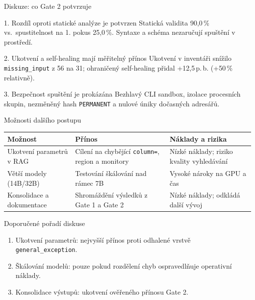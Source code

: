 \documentclass[aspectratio=169,11pt]{beamer}
\begin{document}
\begin{frame}[t]{Diskuze: co Gate 2 potvrzuje}
  \small
  \begin{block}{1. Rozdíl oproti statické analýze je potvrzen}
    Statická validita 90,0\,\% vs.\ spustitelnost na 1. pokus 25,0\,\%.
    Syntaxe a schéma nezaručují spuštění v prostředí.
  \end{block}

  \vspace{2mm}

  \begin{block}{2. Ukotvení a self-healing mají měřitelný přínos}
    Ukotvení v inventáři snížilo \texttt{missing\_input} z 56 na 31; ohraničený
    self-healing přidal +12,5\,p.\,b. (+50\,\% relativně).
  \end{block}

  \vspace{2mm}

  \begin{block}{3. Bezpečnost spuštění je prokázána}
    Bezhlavý CLI sandbox, izolace procesních skupin, nezměněný hash
    \texttt{PERMANENT} a nulové úniky dočasných adresářů.
  \end{block}
\end{frame}

\begin{frame}[t]{Možnosti dalšího postupu}
  \small
  \begin{table}
    \centering
    \begin{tabular}{@{}p{3.8cm}p{4.2cm}p{5.0cm}@{}}
      \toprule
      \textbf{Možnost} & \textbf{Přínos} & \textbf{Náklady a rizika} \\
      \midrule
      Ukotvení parametrů v RAG
        & Cílení na chybějící \texttt{column=}, region a monitory
        & Nízké náklady; riziko kvality vyhledávání \\
      Větší modely (14B/32B)
        & Testování škálování nad rámec 7B
        & Vysoké nároky na GPU a čas \\
      Konsolidace a dokumentace
        & Shromáždění výsledků z Gate 1 a Gate 2
        & Nízké náklady; odkládá další vývoj \\
      \bottomrule
    \end{tabular}
  \end{table}

  \begin{block}{Doporučené pořadí diskuse}
    \begin{enumerate}
      \item Ukotvení parametrů: nejvyšší přínos proti odhalené vrstvě
            \texttt{general\_exception}.
      \item Škálování modelů: pouze pokud rozdělení chyb ospravedlňuje
            operativní náklady.
      \item Konsolidace výstupů: ukotvení ověřeného přínosu Gate 2.
    \end{enumerate}
  \end{block}
\end{frame}
\end{document}
